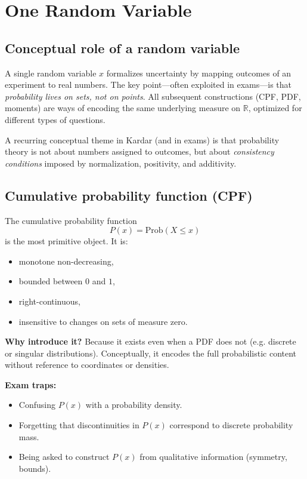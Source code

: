 \documentclass[9pt,twocoloumn]{article}
\begin{document}
\section{One Random Variable}

\subsection*{Conceptual role of a random variable}
A single random variable $x$ formalizes uncertainty by mapping outcomes of an experiment to real numbers. The key point—often exploited in exams—is that \emph{probability lives on sets, not on points}. All subsequent constructions (CPF, PDF, moments) are ways of encoding the same underlying measure on $\mathbb{R}$, optimized for different types of questions.

A recurring conceptual theme in Kardar (and in exams) is that probability theory is not about numbers assigned to outcomes, but about \emph{consistency conditions} imposed by normalization, positivity, and additivity.

\subsection*{Cumulative probability function (CPF)}
The cumulative probability function
\[
P(x) = \mathrm{Prob}(X \le x)
\]
is the most primitive object. It is:
\begin{itemize}
\item monotone non-decreasing,
\item bounded between $0$ and $1$,
\item right-continuous,
\item insensitive to changes on sets of measure zero.
\end{itemize}

\textbf{Why introduce it?} Because it exists even when a PDF does not (e.g. discrete or singular distributions). Conceptually, it encodes the full probabilistic content without reference to coordinates or densities.

\textbf{Exam traps:}
\begin{itemize}
\item Confusing $P(x)$ with a probability density.
\item Forgetting that discontinuities in $P(x)$ correspond to discrete probability mass.
\item Being asked to construct $P(x)$ from qualitative information (symmetry, bounds).
\end{itemize}
\end{document}
